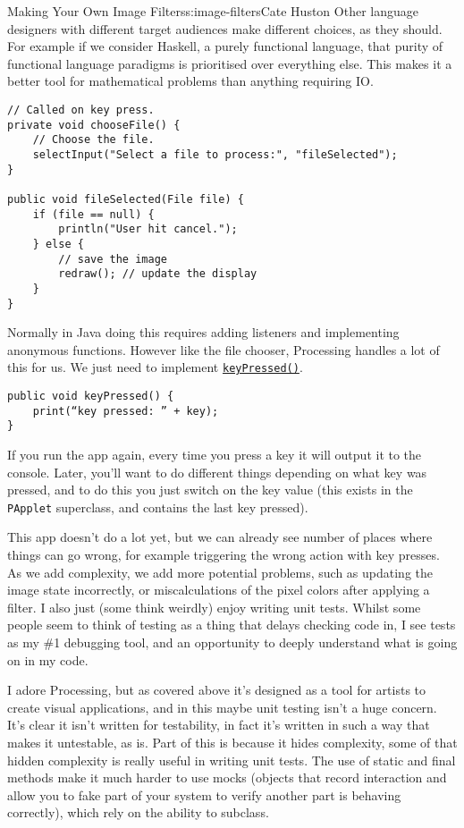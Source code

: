 \begin{aosachapter}{Making Your Own Image Filters}{s:image-filters}{Cate Huston}
Other language designers with different target audiences make different
choices, as they should. For example if we consider Haskell, a purely
functional language, that purity of functional language paradigms is
prioritised over everything else. This makes it a better tool for
mathematical problems than anything requiring IO.

\begin{verbatim}
// Called on key press.
private void chooseFile() {
    // Choose the file.
    selectInput("Select a file to process:", "fileSelected");
}

public void fileSelected(File file) {
    if (file == null) {
        println("User hit cancel.");
    } else {
        // save the image
        redraw(); // update the display
    }
}
\end{verbatim}

\label{responding-to-key-presses}

Normally in Java doing this requires adding listeners and implementing
anonymous functions. However like the file chooser, Processing handles a
lot of this for us. We just need to implement
\href{https://www.processing.org/reference/keyPressed_.html}{\texttt{keyPressed()}}.

\begin{verbatim}
public void keyPressed() {
    print(“key pressed: ” + key);
}
\end{verbatim}

If you run the app again, every time you press a key it will output it
to the console. Later, you'll want to do different things depending on
what key was pressed, and to do this you just switch on the key value
(this exists in the \texttt{PApplet} superclass, and contains the last
key pressed).

\label{writing-tests}

This app doesn't do a lot yet, but we can already see number of places
where things can go wrong, for example triggering the wrong action with
key presses. As we add complexity, we add more potential problems, such
as updating the image state incorrectly, or miscalculations of the pixel
colors after applying a filter. I also just (some think weirdly) enjoy
writing unit tests. Whilst some people seem to think of testing as a
thing that delays checking code in, I see tests as my \#1 debugging
tool, and an opportunity to deeply understand what is going on in my
code.

I adore Processing, but as covered above it's designed as a tool for
artists to create visual applications, and in this maybe unit testing
isn't a huge concern. It's clear it isn't written for testability, in
fact it's written in such a way that makes it untestable, as is. Part of
this is because it hides complexity, some of that hidden complexity is
really useful in writing unit tests. The use of static and final methods
make it much harder to use mocks (objects that record interaction and
allow you to fake part of your system to verify another part is behaving
correctly), which rely on the ability to subclass.


\end{aosachapter}

